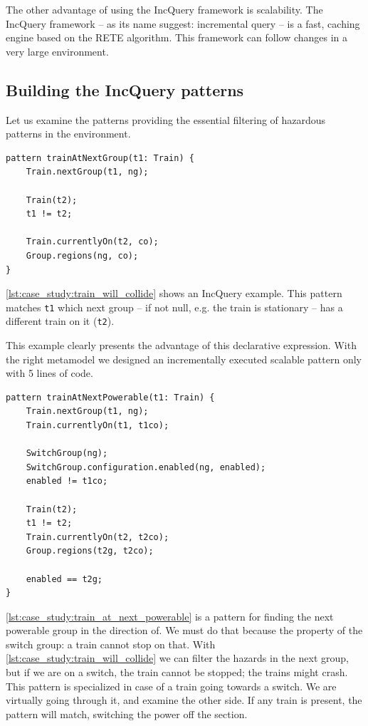 The other advantage of using the IncQuery framework is scalability. The IncQuery framework -- as its name suggest: incremental query -- is a fast, caching engine based on the RETE algorithm. This framework can follow changes in a very large environment. 

\subsection{Building the IncQuery patterns}
\label{sec:case_study:pattern_building}

Let us examine the patterns providing the essential filtering of hazardous patterns in the environment.
\\[1ex]

\begin{lstlisting}[caption={Collision detection},label=lst:case_study:train_will_collide]
pattern trainAtNextGroup(t1: Train) {
	Train.nextGroup(t1, ng);
	
	Train(t2);
	t1 != t2;
	
	Train.currentlyOn(t2, co);
	Group.regions(ng, co);
}
\end{lstlisting}

\cref{lst:case_study:train_will_collide} shows an IncQuery example. This pattern matches \verb+t1+ which next group -- if not null, e.g. the train is stationary -- has a different train on it (\verb+t2+).

This example clearly presents the advantage of this declarative expression. With the right metamodel we designed an incrementally executed scalable pattern only with 5 lines of code.
\\[1ex]

\begin{lstlisting}[caption={Collision detection},label=lst:case_study:train_at_next_powerable]
pattern trainAtNextPowerable(t1: Train) {
	Train.nextGroup(t1, ng);
	Train.currentlyOn(t1, t1co);
	
	SwitchGroup(ng);
	SwitchGroup.configuration.enabled(ng, enabled);
	enabled != t1co;
	
	Train(t2);
	t1 != t2;
	Train.currentlyOn(t2, t2co);
	Group.regions(t2g, t2co);
	
	enabled == t2g;
}
\end{lstlisting}

\newpage
\cref{lst:case_study:train_at_next_powerable} is a pattern for finding the next powerable group in the direction of. We must do that because the property of the switch group: a train cannot stop on that. With \cref{lst:case_study:train_will_collide} we can filter the hazards in the next group, but if we are on a switch, the train cannot be stopped; the trains might crash. This pattern is specialized in case of a train going towards a switch. We are virtually going through it, and examine the other side. If any train is present, the pattern will match, switching the power off the section.
\\[1ex]

